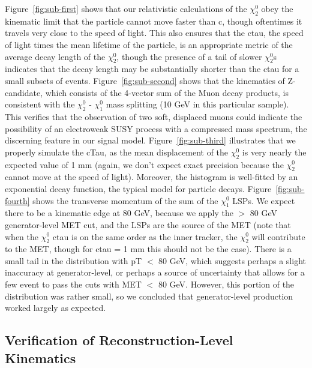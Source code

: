 \documentclass{article}
\begin{document}
Figure~\ref{fig:sub-first} shows that our relativistic calculations of the $\chi_{2}^{0}$ obey the kinematic limit that the particle cannot move faster than c, though oftentimes it travels very close to the speed of light. This also ensures that the ctau, the speed of light times the mean lifetime of the particle, is an appropriate metric of the average decay length of the $\chi_{2}^{0}$, though the presence of a tail of slower $\chi_{2}^{0}$s indicates that the decay length may be substantially shorter than the ctau for a small subsets of events. Figure~\ref{fig:sub-second} shows that the kinematics of Z-candidate, which consists of the 4-vector sum of the Muon decay products, is consistent with the $\chi_{2}^{0}$ - $\chi_{1}^{0}$ mass splitting (10 GeV in this particular sample). This verifies that the observation of two soft, displaced muons could indicate the possibility of an electroweak SUSY process with a compressed mass spectrum, the discerning feature in our signal model. Figure~\ref{fig:sub-third} illustrates that we properly simulate the cTau, as the mean displacement of the $\chi_{2}^{0}$ is very nearly the expected value of 1 mm (again, we don't expect exact precision because the $\chi_{2}^{0}$ cannot move at the speed of light). Moreover, the histogram is well-fitted by an exponential decay function, the typical model for particle decays. Figure~\ref{fig:sub-fourth} shows the transverse momentum of the sum of the $\chi_{1}^{0}$ LSPs. We expect there to be a kinematic edge at 80 GeV, because we apply the $>$ 80 GeV generator-level MET cut, and the LSPs are the source of the MET (note that when the $\chi_{2}^{0}$ ctau is on the same order as the inner tracker, the $\chi_{2}^{0}$ will contribute to the MET, though for ctau = 1 mm this should not be the case). There is a small tail in the distribution with pT $<$ 80 GeV, which suggests perhaps a slight inaccuracy at generator-level, or perhaps a source of uncertainty that allows for a few event to pass the cuts with MET $<$ 80 GeV. However, this portion of the distribution was rather small, so we concluded that generator-level production worked largely as expected.
\subsection{Verification of Reconstruction-Level Kinematics}
\end{document}
